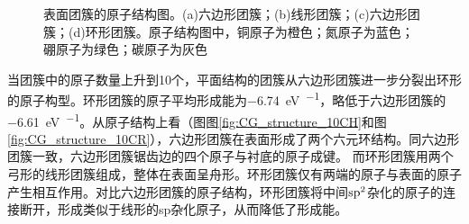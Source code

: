 \begin{figure}[htb]
{            \label{fig:CG_structure_10CH}
        }
        \caption{表面团簇的原子结构图。(a)六边形团簇；(b)线形团簇；(c)六边形团簇；(d)环形团簇。原子结构图中，铜原子为橙色；氮原子为蓝色；硼原子为绿色；碳原子为灰色}
        \label{fig:CG_CG_structure_6-10C}
    \end{figure}

    当团簇中的原子数量上升到10个，平面结构的团簇从六边形团簇进一步分裂出环形的原子构型。环形团簇的原子平均形成能为\SI{-6.74}{\electronvolt\per\atom}，略低于六边形团簇的\SI{-6.61}{\electronvolt\per\atom}。从原子结构上看（图图\ref{fig:CG_structure_10CH}和图\ref{fig:CG_structure_10CR}），六边形团簇在表面形成了两个六元环结构。同六边形团簇一致，六边形团簇锯齿边的四个原子与衬底的原子成键。
    而环形团簇用两个弓形的线形团簇组成，整体在表面呈舟形。环形团簇仅有两端的原子与表面的原子产生相互作用。对比六边形团簇的原子结构，环形团簇将中间$\rm sp^2$杂化的原子的连接断开，形成类似于线形的sp杂化原子，从而降低了形成能。
    
